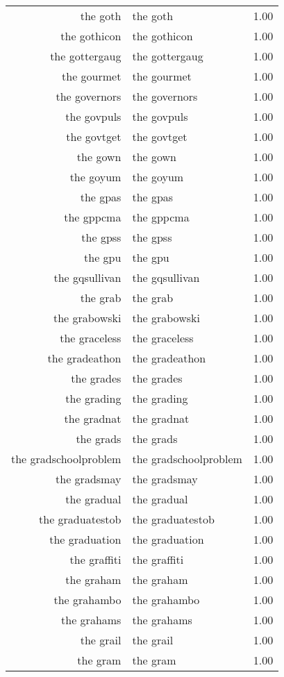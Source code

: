 \begin{table}[ht]
\begin{tabular}{rlr}
  the goth & the goth & 1.00 \\ 
  the gothicon & the gothicon & 1.00 \\ 
  the gottergaug & the gottergaug & 1.00 \\ 
  the gourmet & the gourmet & 1.00 \\ 
  the governors & the governors & 1.00 \\ 
  the govpuls & the govpuls & 1.00 \\ 
  the govtget & the govtget & 1.00 \\ 
  the gown & the gown & 1.00 \\ 
  the goyum & the goyum & 1.00 \\ 
  the gpas & the gpas & 1.00 \\ 
  the gppcma & the gppcma & 1.00 \\ 
  the gpss & the gpss & 1.00 \\ 
  the gpu & the gpu & 1.00 \\ 
  the gqsullivan & the gqsullivan & 1.00 \\ 
  the grab & the grab & 1.00 \\ 
  the grabowski & the grabowski & 1.00 \\ 
  the graceless & the graceless & 1.00 \\ 
  the gradeathon & the gradeathon & 1.00 \\ 
  the grades & the grades & 1.00 \\ 
  the grading & the grading & 1.00 \\ 
  the gradnat & the gradnat & 1.00 \\ 
  the grads & the grads & 1.00 \\ 
  the gradschoolproblem & the gradschoolproblem & 1.00 \\ 
  the gradsmay & the gradsmay & 1.00 \\ 
  the gradual & the gradual & 1.00 \\ 
  the graduatestob & the graduatestob & 1.00 \\ 
  the graduation & the graduation & 1.00 \\ 
  the graffiti & the graffiti & 1.00 \\ 
  the graham & the graham & 1.00 \\ 
  the grahambo & the grahambo & 1.00 \\ 
  the grahams & the grahams & 1.00 \\ 
  the grail & the grail & 1.00 \\ 
  the gram & the gram & 1.00 \\ 

\end{tabular}
\end{table}
